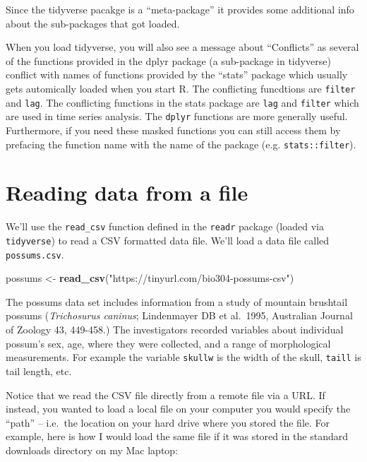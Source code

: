 \documentclass[]{book}
\newenvironment{Shaded}{\begin{snugshade}}{\end{snugshade}}
\newcommand{\KeywordTok}[1]{\textcolor[rgb]{0.13,0.29,0.53}{\textbf{#1}}}
\newcommand{\NormalTok}[1]{#1}
\newcommand{\StringTok}[1]{\textcolor[rgb]{0.31,0.60,0.02}{#1}}
\theoremstyle{definition}
\theoremstyle{definition}
\theoremstyle{definition}
\theoremstyle{remark}
\begin{document}
Since the tidyverse pacakge is a ``meta-package'' it provides some
additional info about the sub-packages that got loaded.

When you load tidyverse, you will also see a message about ``Conflicts''
as several of the functions provided in the dplyr package (a sub-package
in tidyverse) conflict with names of functions provided by the ``stats''
package which usually gets automically loaded when you start R. The
conflicting funcdtions are \texttt{filter} and \texttt{lag}. The
conflicting functions in the stats package are \texttt{lag} and
\texttt{filter} which are used in time series analysis. The
\texttt{dplyr} functions are more generally useful. Furthermore, if you
need these masked functions you can still access them by prefacing the
function name with the name of the package (e.g.
\texttt{stats::filter}).

\hypertarget{reading-data-from-a-file}{%
\section{Reading data from a file}\label{reading-data-from-a-file}}

We'll use the \texttt{read\_csv} function defined in the \texttt{readr}
package (loaded via \texttt{tidyverse}) to read a CSV formatted data
file. We'll load a data file called \texttt{possums.csv}.

\begin{Shaded}
\begin{Highlighting}[]
\NormalTok{possums <-}\StringTok{ }\KeywordTok{read_csv}\NormalTok{(}\StringTok{"https://tinyurl.com/bio304-possums-csv"}\NormalTok{)}
\end{Highlighting}
\end{Shaded}

The possums data set includes information from a study of mountain
brushtail possums (\emph{Trichosurus caninus}; Lindenmayer DB et
al.~1995, Australian Journal of Zoology 43, 449-458.) The investigators
recorded variables about individual possum's sex, age, where they were
collected, and a range of morphological measurements. For example the
variable \texttt{skullw} is the width of the skull, \texttt{taill} is
tail length, etc.

Notice that we read the CSV file directly from a remote file via a URL.
If instead, you wanted to load a local file on your computer you would
specify the ``path'' -- i.e.~the location on your hard drive where you
stored the file. For example, here is how I would load the same file if
it was stored in the standard downloads directory on my Mac laptop:
\end{document}
